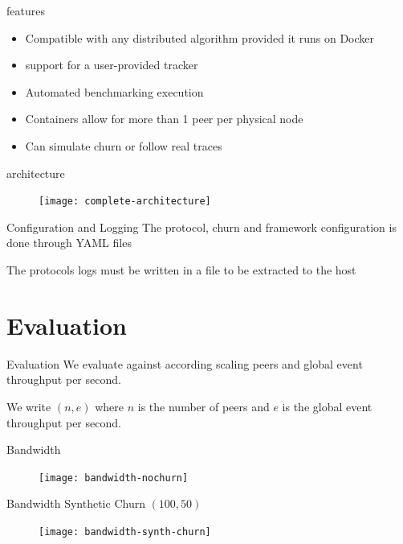 \begin{frame}{\sys{} features}
    \begin{itemize}
    	\item Compatible with any distributed algorithm provided it runs on Docker
    	\item support for a user-provided tracker
    	\item Automated benchmarking execution
    	\item Containers allow for more than 1 peer per physical node
    	\item Can simulate churn or follow real traces
    \end{itemize}
\end{frame}

\begin{frame}{\sys{} architecture}
	\begin{figure}
		\texttt{[image: complete-architecture]}
	\end{figure}
\end{frame}

\begin{frame}{\sys{} Configuration and Logging}
	The protocol, churn and framework configuration is done through \textsc{YAML} files
	
	The protocols logs must be written in a file to be extracted to the host
\end{frame}

\section{Evaluation}
\subtitle[Evaluation]{Evaluation}

\begin{frame}{Evaluation}
    We evaluate \epto{} against \jgroups{} according scaling peers and global event throughput per second.
    
    We write $(n,e)$ where $n$ is the number of peers and $e$ is the global event throughput per second.
\end{frame}

\begin{frame}{Bandwidth}
	\begin{figure}
		\texttt{[image: bandwidth-nochurn]}
	\end{figure}
\end{frame}

\begin{frame}{Bandwidth Synthetic Churn $(100,50)$}
	\begin{figure}
		\texttt{[image: bandwidth-synth-churn]}
	\end{figure}
\end{frame}

